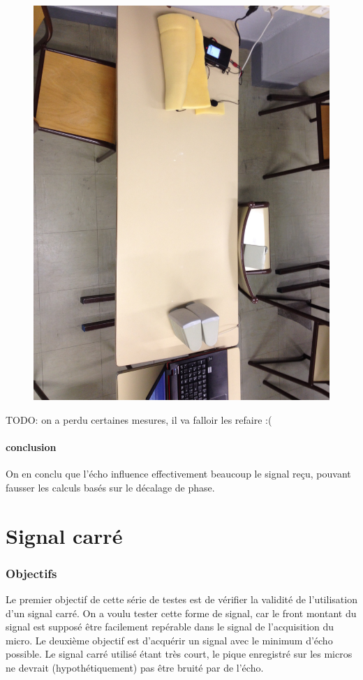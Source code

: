 \documentclass[12pt,a4paper]{article}
\begin{document}
\begin{figure}[H]
\includegraphics[width=\textwidth]{../donnees25-02/IMG_0924.jpg} 
\end{figure}

TODO: on a perdu certaines mesures, il va falloir les refaire :(

\subsection{conclusion}
On en conclu que l'écho influence effectivement beaucoup le signal reçu, pouvant fausser les calculs basés sur le décalage de phase.

\part{Signal carré}
\section{Objectifs}
	Le premier objectif de cette série de testes est de vérifier la validité de l'utilisation d'un signal carré.
	On a voulu tester cette forme de signal, car le front montant du signal est supposé être facilement repérable dans le signal de l'acquisition du micro.
	Le deuxième objectif est d'acquérir un signal avec le minimum d'écho possible. Le signal carré utilisé étant très court, le pique enregistré sur les micros ne devrait (hypothétiquement) pas être bruité par de l'écho.
\end{document}
